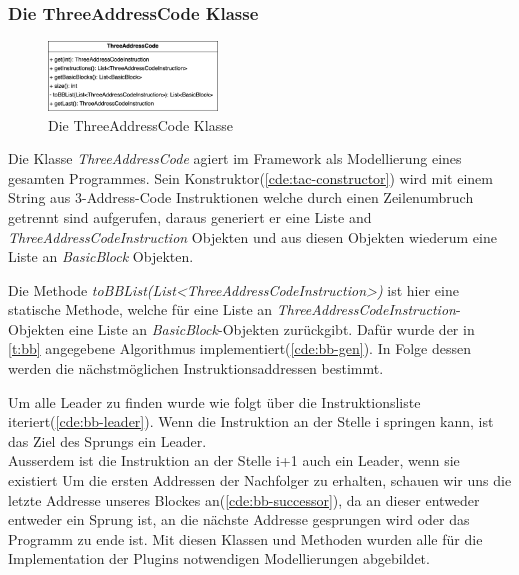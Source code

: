 \newpage
\subsubsection{Die ThreeAddressCode Klasse}
\begin{figure}
  \vspace{-15pt}
  \centering
  \includegraphics[width=0.4\textwidth]{fig/3AC_class_methods.png}
  \caption{Die ThreeAddressCode Klasse}
  \label{fig:ThreeAddressCode}
\end{figure}

Die Klasse \textit{ThreeAddressCode} agiert im Framework als Modellierung eines
gesamten Programmes. Sein Konstruktor(\cref{cde:tac-constructor}) wird mit
einem String aus 3-Address-Code Instruktionen welche durch einen Zeilenumbruch getrennt sind
aufgerufen, daraus generiert er eine Liste and \textit{ThreeAddressCodeInstruction}
Objekten und aus diesen Objekten wiederum eine Liste an \textit{BasicBlock} Objekten.

Die Methode \textit{toBBList(List<ThreeAddressCodeInstruction>)} ist hier eine statische Methode, welche für eine
Liste an \textit{ThreeAddressCodeInstruction}-Objekten eine Liste an \textit{BasicBlock}-Objekten
zurückgibt. Dafür wurde der in \cref{t:bb} angegebene Algorithmus implementiert(\cref{cde:bb-gen}).
In Folge dessen werden die nächstmöglichen Instruktionsaddressen bestimmt.

Um alle Leader zu finden wurde wie folgt über die Instruktionsliste iteriert(\cref{cde:bb-leader}).
Wenn die Instruktion an der Stelle i springen kann, ist das Ziel des Sprungs ein Leader.\\
Ausserdem ist die Instruktion an der Stelle i+1 auch ein Leader, wenn sie existiert
Um die ersten Addressen der Nachfolger zu erhalten, schauen wir uns die letzte
Addresse unseres Blockes an(\cref{cde:bb-successor}), da an dieser entweder entweder ein Sprung ist,
an die nächste Addresse gesprungen wird oder das Programm zu ende ist.
Mit diesen Klassen und Methoden wurden alle für die Implementation der Plugins
notwendigen Modellierungen abgebildet. 


\newpage
